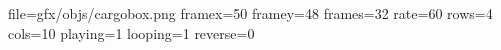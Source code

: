 file=gfx/objs/cargobox.png
framex=50
framey=48
frames=32
rate=60
rows=4
cols=10
playing=1
looping=1
reverse=0